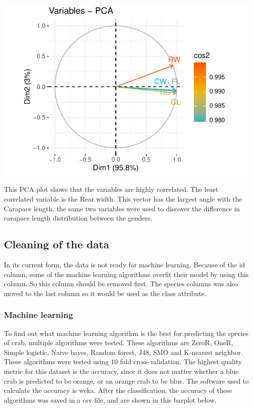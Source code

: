 \documentclass[
]{article}
\begin{document}
\begin{center}\includegraphics{CrabProject_files/figure-latex/pca-1} \end{center}

This PCA plot shows that the variables are highly correlated. The least
correlated variable is the Rear width. This vector has the largest angle
with the Carapace length, the same two variables were used to discover
the difference in carapace length distribution between the genders.

\hypertarget{cleaning-of-the-data}{%
\subsection{Cleaning of the data}\label{cleaning-of-the-data}}

In its current form, the data is not ready for machine learning. Because
of the id column, some of the machine learning algorithms overfit their
model by using this column. So this column should be removed first. The
species columns was also moved to the last column so it would be used as
the class attribute.

\hypertarget{machine-learning}{%
\subsubsection{Machine learning}\label{machine-learning}}

To find out what machine learning algorithm is the best for predicting
the species of crab, multiple algorithms were tested. These algorithms
are ZeroR, OneR, Simple logistic, Naive bayes, Random forest, J48, SMO
and K-nearest neighbor. These algorithms were tested using 10 fold
cross-validation. The highest quality metric for this dataset is the
accuracy, since it does not matter whether a blue crab is predicted to
be orange, or an orange crab to be blue. The software used to calculate
the accuracy is weka. After the classification, the accuracy of these
algorithms was saved in a csv file, and are shown in this barplot below.
\end{document}

